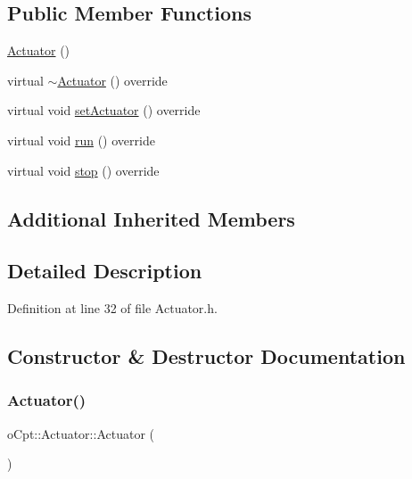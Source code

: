 \subsection*{Public Member Functions}
\begin{DoxyCompactItemize}
\item 
\hyperlink{classo_cpt_1_1_actuator_a715b50b49623386a7c04fd5fc713a626}{Actuator} ()
\item 
virtual \hyperlink{classo_cpt_1_1_actuator_a1934864651148186d4e9728560ede248}{$\sim$\+Actuator} () override
\item 
virtual void \hyperlink{classo_cpt_1_1_actuator_a3a3813e5730f0257e74de7300eeeffa1}{set\+Actuator} () override
\item 
virtual void \hyperlink{classo_cpt_1_1_actuator_a8985818fcfb644acce17ce50c5c7f86b}{run} () override
\item 
virtual void \hyperlink{classo_cpt_1_1_actuator_aa41132ff134e8b067353459dedbb0f37}{stop} () override
\end{DoxyCompactItemize}
\subsection*{Additional Inherited Members}


\subsection{Detailed Description}


Definition at line 32 of file Actuator.\+h.



\subsection{Constructor \& Destructor Documentation}
\hypertarget{classo_cpt_1_1_actuator_a715b50b49623386a7c04fd5fc713a626}{}\label{classo_cpt_1_1_actuator_a715b50b49623386a7c04fd5fc713a626} 
\subsubsection{\texorpdfstring{Actuator()}{Actuator()}}
{\footnotesize\ttfamily o\+Cpt\+::\+Actuator\+::\+Actuator (\begin{DoxyParamCaption}{ }\end{DoxyParamCaption})}



